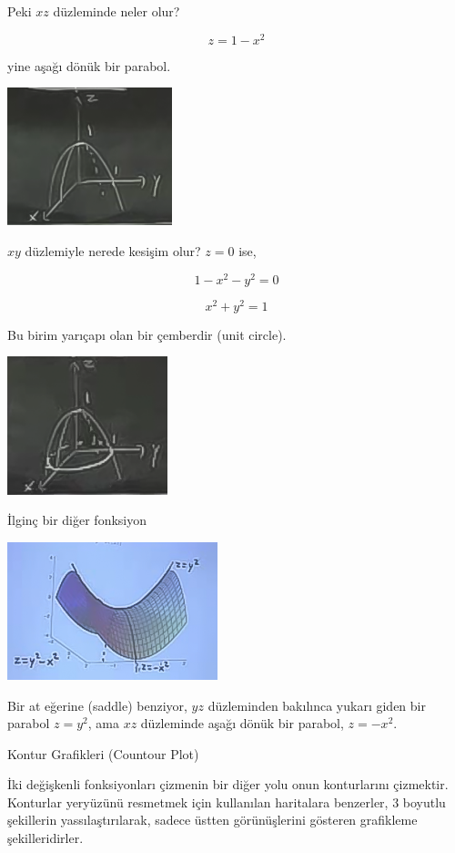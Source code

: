 \documentclass[12pt,fleqn]{article}\usepackage{../../common}
\begin{document}
Peki $xz$ düzleminde neler olur?

$$ z = 1- x^2 $$

yine aşağı dönük bir parabol. 

\includegraphics[height=4cm]{8_4.png}

$xy$ düzlemiyle nerede kesişim olur? $z=0$ ise, 

$$ 1-x^2-y^2 = 0 $$

$$ x^2 + y^2 = 1 $$

Bu birim yarıçapı olan bir çemberdir (unit circle). 

\includegraphics[height=4cm]{8_5.png}

İlginç bir diğer fonksiyon

\includegraphics[height=4cm]{8_6.png}

Bir at eğerine (saddle) benziyor, $yz$ düzleminden bakılınca yukarı giden bir
parabol $z=y^2$, ama $xz$ düzleminde aşağı dönük bir parabol, $z=-x^2$.

Kontur Grafikleri (Countour Plot)

İki değişkenli fonksiyonları çizmenin bir diğer yolu onun konturlarını
çizmektir. Konturlar yeryüzünü resmetmek için kullanılan haritalara benzerler, 3
boyutlu şekillerin yassılaştırılarak, sadece üstten görünüşlerini gösteren
grafikleme şekilleridirler.
\end{document}
